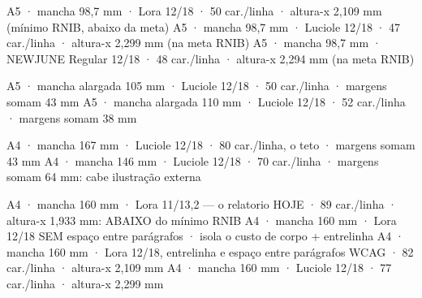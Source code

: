 \documentclass{article}
\begin{document}
%
  {A5 · mancha 98,7 mm · Lora 12/18 · 50 car./linha · altura-x 2,109 mm (mínimo RNIB, abaixo da meta)}
%
  {A5 · mancha 98,7 mm · Luciole 12/18 · 47 car./linha · altura-x 2,299 mm (na meta RNIB)}
%
  {A5 · mancha 98,7 mm · NEWJUNE Regular 12/18 · 48 car./linha · altura-x 2,294 mm (na meta RNIB)}

%
  {A5 · mancha alargada 105 mm · Luciole 12/18 · 50 car./linha · margens somam 43 mm}
%
  {A5 · mancha alargada 110 mm · Luciole 12/18 · 52 car./linha · margens somam 38 mm}

%
  {A4 · mancha 167 mm · Luciole 12/18 · 80 car./linha, o teto · margens somam 43 mm}
%
  {A4 · mancha 146 mm · Luciole 12/18 · 70 car./linha · margens somam 64 mm: cabe ilustração externa}

%
  {A4 · mancha 160 mm · Lora 11/13,2 — o relatorio HOJE · 89 car./linha · altura-x 1,933 mm: ABAIXO do mínimo RNIB}
%
  {A4 · mancha 160 mm · Lora 12/18 SEM espaço entre parágrafos · isola o custo de corpo + entrelinha}
%
  {A4 · mancha 160 mm · Lora 12/18, entrelinha e espaço entre parágrafos WCAG · 82 car./linha · altura-x 2,109 mm}
%
  {A4 · mancha 160 mm · Luciole 12/18 · 77 car./linha · altura-x 2,299 mm}
\end{document}
